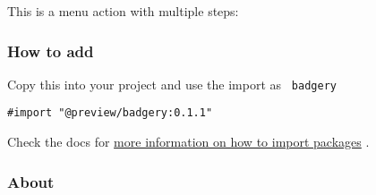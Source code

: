 \begin{Shaded}
\begin{Highlighting}[]
\end{Highlighting}
\end{Shaded}

This is a menu action with multiple steps:

\begin{Shaded}
\begin{Highlighting}[]
\end{Highlighting}
\end{Shaded}

\subsubsection{How to add}\label{how-to-add}

Copy this into your project and use the import as \texttt{\ badgery\ }

\begin{verbatim}
#import "@preview/badgery:0.1.1"
\end{verbatim}



Check the docs for
\href{https://typst.app/docs/reference/scripting/\#packages}{more
information on how to import packages} .

\subsubsection{About}\label{about}

